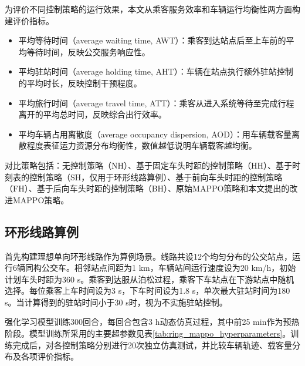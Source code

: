 \documentclass[UTF8,zihao=-4,fontset=none]{ctexart}
\begin{document}
为评价不同控制策略的运行效果，本文从乘客服务效率和车辆运行均衡性两方面构建评价指标。

\begin{itemize}
  \item 平均等待时间（average waiting time, AWT）：乘客到达站点后至上车前的平均等待时间，反映公交服务响应性。
  \item 平均驻站时间（average holding time, AHT）：车辆在站点执行额外驻站控制的平均时长，反映控制干预程度。
  \item 平均旅行时间（average travel time, ATT）：乘客从进入系统等待至完成行程离开的平均总时间，反映综合出行效率。
  \item 平均车辆占用离散度（average occupancy dispersion, AOD）：用车辆载客量离散程度表征运力资源分布均衡性，数值越低说明车辆载客越均衡。
\end{itemize}

对比策略包括：无控制策略（NH）、基于固定车头时距的控制策略（HH）、基于时刻表的控制策略（SH，仅用于环形线路算例）、基于前向车头时距的控制策略（FH）、基于后向车头时距的控制策略（BH）、原始MAPPO策略和本文提出的改进MAPPO策略。

\subsection{环形线路算例}

首先构建理想单向环形线路作为算例场景。线路共设12个均匀分布的公交站点，运行6辆同构公交车。相邻站点间距为1 km，车辆站间运行速度设为20 km/h，初始计划车头时距为360 s。乘客到达服从泊松过程，乘客下车站点在下游站点中随机选择。每位乘客上车时间设为3 s，下车时间设为1.8 s，单次最大驻站时间为180 s。当计算得到的驻站时间小于30 s时，视为不实施驻站控制。

强化学习模型训练300回合，每回合包含3 h动态仿真过程，其中前25 min作为预热阶段。模型训练所采用的主要超参数见表\ref{tab:ring_mappo_hyperparameters}。训练完成后，对各控制策略分别进行20次独立仿真测试，并比较车辆轨迹、载客量分布及各项评价指标。
\end{document}
